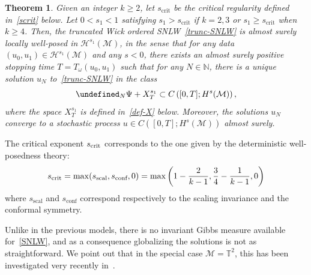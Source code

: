 \documentclass[10pt]{amsart}
\newtheorem{theo}{Theorem}[section]
\theoremstyle{definition}\newtheorem{defi}[theo]{Definition}\newtheorem{rema}[theo]{Remark}\newtheorem{exam}[theo]{Example}\newtheorem{exem}[theo]{Example}\newtheorem{nota}[theo]{Notation}
\newcommand{\scrit}{s_{\textup{crit}}}
\newcommand{\sscal}{s_{\text{scal}}}
\newcommand{\sconf}{s_{\text{conf}}}
\newcommand{\T}{\mathbb{T}}
\newcommand{\N}{\mathbb{N}}
\let\P= \undefined
\newcommand{\P}{\mathbf{P}}
\newcommand{\M}{\mathcal{M}}
\renewcommand{\H}{\mathcal{H}}
\newcommand{\crit}{\mathrm{crit}}
\renewcommand{\o}{\omega}
\begin{document}
\begin{theo}\label{thm-SNLW}
Given an integer $k \geq 2$, let $s_\crit$ be the critical regularity defined in~\eqref{scrit} below. Let $0<s_1<1$ satisfying $s_1>s_\crit$ if $k=2,3$ or $s_1\geq s_\crit$ when $k\geq 4$. Then, the truncated Wick ordered SNLW~\eqref{trunc-SNLW} is almost surely locally well-posed in $\H^{s_1}(\M)$, in the sense that for any data $(u_0,u_1)\in\H^{s_1}(\M)$ and any $s<0$, there exists an almost surely positive stopping time $T=T_\o(u_0,u_1)$ such that for any $N\in\N$, there is a unique solution $u_N$ to~\eqref{trunc-SNLW} in the class
\begin{equation*}
\P_N\Psi + X^{s_1}_T\subset C\left([0, T];H^{s}(\M)\right),
\end{equation*}
where the space $X^{s_1}_T$ is defined in~\eqref{def-X} below. Moreover, the solutions $u_N$ converge to a stochastic process $u\in C([0,T];H^s(\M))$ almost surely.
\end{theo}


The critical exponent $\scrit$ corresponds to the one given by the deterministic well-posedness theory:
\begin{equation}\label{scrit}
\scrit=\max(\sscal,\sconf,0)=\max\left(1-\frac2{k-1},\frac34-\frac1{k-1},0\right)
\end{equation}
where $\sscal$ and $\sconf$ correspond respectively to the scaling invariance and the conformal symmetry.

Unlike in the previous models, there is no invariant Gibbs measure available for~\eqref{SNLW}, and as a consequence globalizing the solutions is not as straightforward. We point out that in the special case $\M=\T^2$, this has been investigated very recently in~\cite{GKOT}.
\end{document}

